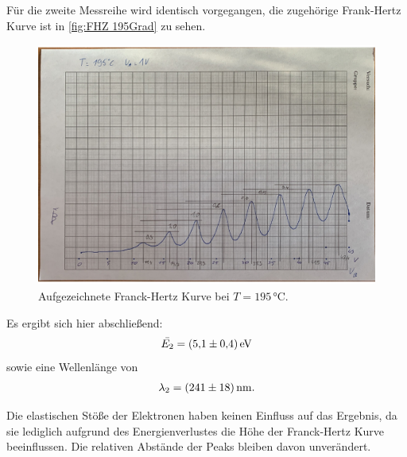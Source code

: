 Für die zweite Messreihe wird identisch vorgegangen, die zugehörige Frank-Hertz Kurve ist in \autoref{fig:FHZ 195Grad} zu sehen.

\begin{figure}[H]
  \centering
  \includegraphics[height=8cm]{content/data/FH_195.pdf}
  \caption{Aufgezeichnete Franck-Hertz Kurve bei $T=195\,\unit{\celsius}$.}
  \label{fig:FHZ 195Grad}
\end{figure}

Es ergibt sich hier abschließend:
\begin{gather*}
  \bar{E_2}=\qty{5.1+-0.4}{\electronvolt}
\end{gather*}
sowie eine Wellenlänge von
\begin{gather*}
  \lambda_2=\qty{241+-18}{\nano\meter}.
\end{gather*}

Die elastischen Stöße der Elektronen haben keinen Einfluss auf das Ergebnis, da sie lediglich aufgrund des
Energienverlustes die Höhe der Franck-Hertz Kurve beeinflussen. Die relativen Abstände der Peaks bleiben 
davon unverändert.